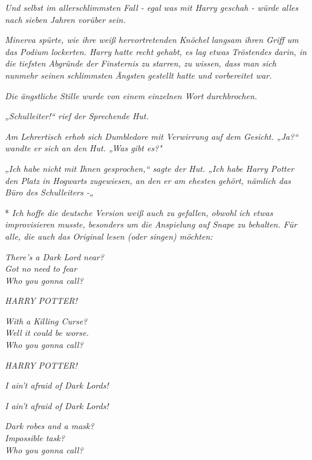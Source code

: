 {\emph{Und selbst im allerschlimmsten Fall - egal} \emph{\emph{was}} \emph{mit Harry geschah - würde} \emph{alles} \emph{nach} \emph{sieben Jahren vorüber sein.}

\emph{Minerva spürte, wie ihre weiß hervortretenden Knöchel langsam ihren Griff um das Podium lockerten. Harry hatte recht gehabt, es lag etwas} \emph{Tröstendes} \emph{darin, in die tiefsten Abgründe der Finsternis zu starren, zu wissen, dass man sich nunmehr seinen schlimmsten Ängsten gestellt hatte und vorbereitet war.}

\emph{Die ängstliche Stille wurde von einem einzelnen Wort durchbrochen.}

\emph{„Schulleiter!“ rief der Sprechende Hut.}

\emph{Am Lehrertisch erhob sich Dumbledore mit Verwirrung auf dem Gesicht. „Ja?“ wandte er sich an den Hut. „Was gibt es?"}

\emph{„Ich habe nicht mit Ihnen gesprochen,“ sagte der Hut. „Ich habe Harry Potter den Platz in Hogwarts zugewiesen, an den er am ehesten gehört, nämlich das Büro des Schulleiters -„}

* \emph{Ich hoffe die deutsche Version weiß auch zu gefallen, obwohl ich etwas improvisieren musste, besonders um die Anspielung auf Snape zu behalten. Für alle, die auch das Original lesen (oder singen) möchten:}

\emph{\emph{There's a Dark Lord near?\\ Got no need to fear\\ Who you gonna call?}}

\hfill\break

\emph{\emph{HARRY POTTER!}}

\hfill\break

\emph{\emph{With a Killing Curse?\\ Well it could be worse.\\ Who you gonna call?}}

\hfill\break

\emph{\emph{HARRY POTTER!}}

\hfill\break

\emph{\emph{I ain't afraid of Dark Lords!}}

\hfill\break

\emph{\emph{I ain't afraid of Dark Lords!}}

\hfill\break

\emph{\emph{Dark robes and a mask?\\ Impossible task?\\ Who you gonna call?}}

}
